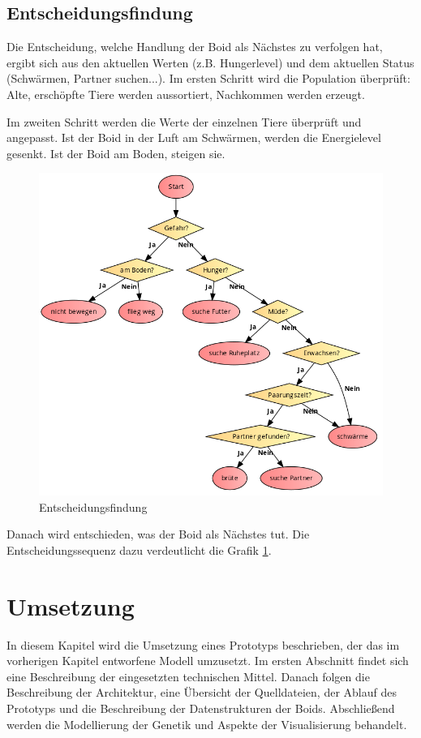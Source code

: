 \documentclass[draft=false
              ,paper=a4
              ,twoside=false
              ,fontsize=11pt
              ,headsepline
              ,BCOR10mm
              ,DIV11
              ,bibtotoc
              ,liststotoc
              ]{scrbook}
\begin{document}
\section{Entscheidungsfindung}
Die Entscheidung, welche Handlung der Boid als Nächstes zu verfolgen hat, ergibt sich aus den aktuellen Werten (z.B. Hungerlevel) und dem aktuellen Status (Schwärmen, Partner suchen...). Im ersten Schritt wird die Population überprüft: Alte, erschöpfte Tiere werden aussortiert, Nachkommen werden erzeugt.

Im zweiten Schritt werden die Werte der einzelnen Tiere überprüft und angepasst. Ist der Boid in der Luft am Schwärmen, werden die Energielevel gesenkt. Ist der Boid am Boden, steigen sie.

\begin{figure}[!h]
\centering
\includegraphics[scale=0.6]{code2flow/entscheidungsfindung.png}
\caption{Entscheidungsfindung}
\label{entscheidung}
\end{figure}

Danach wird entschieden, was der Boid als Nächstes tut. Die Entscheidungssequenz dazu verdeutlicht die Grafik \ref{entscheidung}.

\chapter{Umsetzung}\label{umsetzung}
In diesem Kapitel wird die Umsetzung eines Prototyps beschrieben, der das im vorherigen Kapitel entworfene Modell umzusetzt. Im ersten Abschnitt findet sich eine Beschreibung der eingesetzten technischen Mittel. Danach folgen die Beschreibung der Architektur, eine Übersicht der Quelldateien, der Ablauf des Prototyps und die Beschreibung der Datenstrukturen der Boids. Abschließend werden die Modellierung der Genetik und Aspekte der Visualisierung behandelt.
\end{document}
